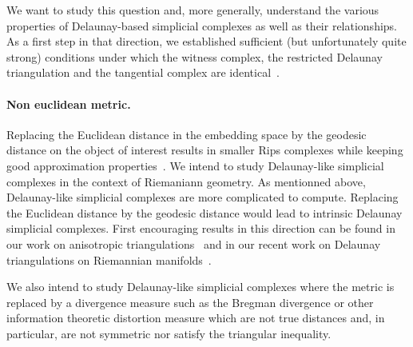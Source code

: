 We want to study this question and, more generally, understand the various properties of Delaunay-based simplicial complexes as well as their relationships. As a  first step in that direction, we established sufficient (but unfortunately quite strong) conditions under which the witness complex, the restricted Delaunay triangulation and the tangential complex are identical~\cite{boissonnat2012stab}. 

\paragraph{Non euclidean metric.}
Replacing the Euclidean distance in the embedding space by the geodesic distance on the object of interest results in smaller Rips complexes while keeping good approximation properties~\cite{dl-clt-2009}. We intend to study Delaunay-like simplicial complexes in the context of Riemaniann geometry. 
As mentionned above, Delaunay-like simplicial complexes are more complicated to compute. Replacing the Euclidean distance by  the geodesic distance would lead to intrinsic Delaunay simplicial complexes. First encouraging results in this direction can be found in our work on anisotropic triangulations~\cite{bwy-luam-08} and in our recent work on Delaunay triangulations on Riemannian manifolds~\cite{boissonnat2012stab}. 


We also intend to study Delaunay-like simplicial complexes where the metric is replaced by a divergence measure such as the Bregman divergence or other information theoretic distortion measure which are not true distances and, in particular, are not symmetric nor satisfy the triangular inequality.


